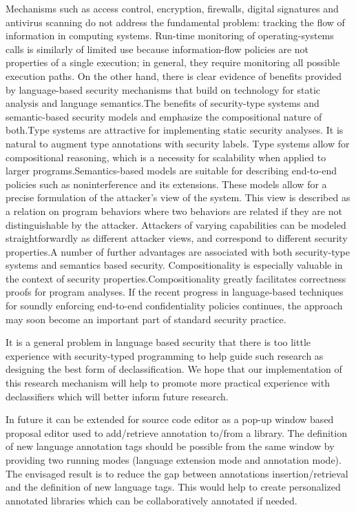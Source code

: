 Mechanisms such as access control, encryption, firewalls, digital
signatures and antivirus scanning do not address the fundamental
problem: tracking the flow of information in computing
systems. Run-time monitoring of operating-systems calls is
similarly of limited use because information-flow policies are
not properties of a single execution; in general, they require
monitoring all possible execution paths. On the other hand,
there is clear evidence of benefits provided by language-based
security mechanisms that build on technology for static analysis
and language semantics.The benefits of security-type systems and semantic-based security models and emphasize the compositional nature of both.Type systems are attractive for
implementing static security analyses. It is natural to augment
type annotations with security labels. Type systems allow for
compositional reasoning, which is a necessity for scalability
when applied to larger programs.Semantics-based models
are suitable for describing end-to-end policies such as
noninterference and its extensions. These models allow for a
precise formulation of the attacker's view of the system. This
view is described as a relation on program behaviors where
two behaviors are related if they are not distinguishable by
the attacker. Attackers of varying capabilities can be modeled
straightforwardly as different attacker views, and correspond
to different security properties.A number of further advantages are
associated with both security-type systems and semantics based
security. Compositionality is especially valuable in the
context of security properties.Compositionality
greatly facilitates correctness proofs for program analyses. If the recent
progress in language-based techniques for soundly enforcing
end-to-end confidentiality policies continues, the approach
may soon become an important part of standard security
practice.

It is a general problem in language based security that there is too little experience with security-typed programming to help guide such research as designing the best
form of declassification. We hope that our implementation of this research
mechanism will help to promote more practical experience
with declassifiers which will better inform future research.

In future it can be extended for source code editor as
a pop-up window based proposal editor used to add/retrieve
annotation to/from a library. The definition of new language
annotation tags should be possible from the same window by
providing two running modes (language extension mode and
annotation mode). The envisaged result is to reduce the gap
between annotations insertion/retrieval and the definition of
new language tags. This would help to create personalized
annotated libraries which can be collaboratively annotated if
needed.